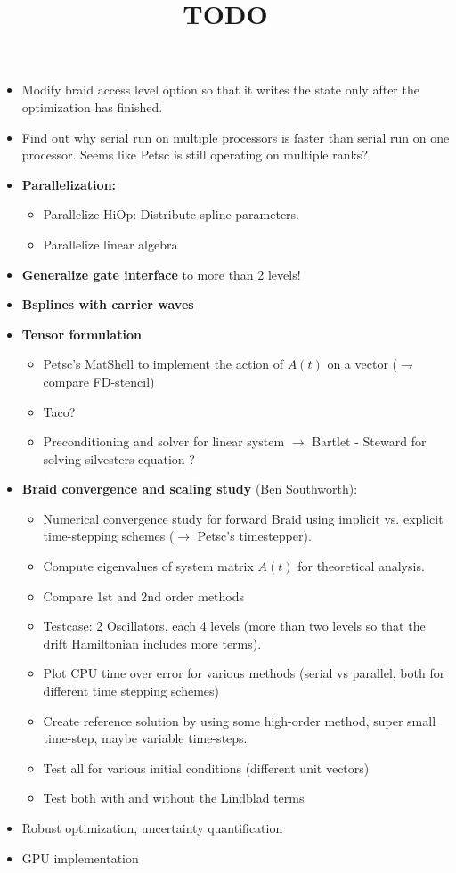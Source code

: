 \documentclass{article}
\title{TODO}
\begin{document}
\maketitle

\begin{itemize}
  \item Modify braid access level option so that it writes the state only after the optimization has finished. 
  \item Find out why serial run on multiple processors is faster than serial run on one processor. Seems like Petsc is still operating on multiple ranks?
  \item \textbf{Parallelization:}
      \begin{itemize}
        \item Parallelize HiOp: Distribute spline parameters.
        \item Parallelize linear algebra 
      \end{itemize}
  \item \textbf{Generalize gate interface} to more than 2 levels!
  \item \textbf{Bsplines with carrier waves}
  \item \textbf{Tensor formulation}
        \begin{itemize}
          \item Petsc's MatShell to implement the action of $A(t)$ on a vector ($\rightharpoondown$ compare FD-stencil)
          \item Taco?
          \item Preconditioning and solver for linear system $\rightarrow$ Bartlet - Steward for solving silvesters equation ?
        \end{itemize}
  \item \textbf{Braid convergence and scaling study} (Ben Southworth):
        \begin{itemize}
          \item Numerical convergence study for forward Braid using implicit vs. explicit time-stepping schemes ($\rightarrow$ Petsc's timestepper).
          \item Compute eigenvalues of system matrix $A(t)$ for theoretical analysis. 
          \item Compare 1st and 2nd order methods
          \item Testcase: 2 Oscillators, each 4 levels (more than two levels so that the drift Hamiltonian includes more terms). 
          \item Plot CPU time over error for various methods (serial vs parallel, both for different time stepping schemes)
          \item Create reference solution by using some high-order method, super small time-step, maybe variable time-steps. 
          \item Test all for various initial conditions (different unit vectors)
          \item Test both with and without the Lindblad terms
        \end{itemize}  
  \item Robust optimization, uncertainty quantification
  \item GPU implementation
\end{itemize}
\end{document}

